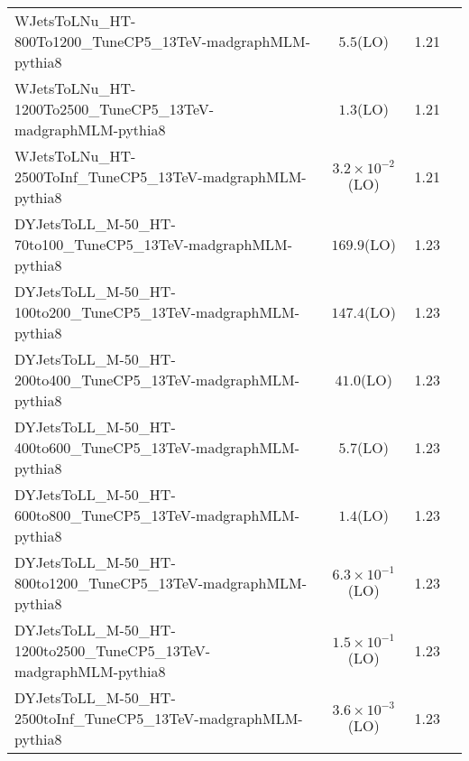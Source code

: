 \begin{tabular}{|l|cc|c|}
    WJetsToLNu\_HT-800To1200\_TuneCP5\_13TeV-madgraphMLM-pythia8                            &     $5.5$(LO)                   & 1.21  \\
    WJetsToLNu\_HT-1200To2500\_TuneCP5\_13TeV-madgraphMLM-pythia8                           &     $1.3$(LO)                   & 1.21  \\
    WJetsToLNu\_HT-2500ToInf\_TuneCP5\_13TeV-madgraphMLM-pythia8                            &     $3.2\times 10^{-2}$(LO)     & 1.21  \\
    DYJetsToLL\_M-50\_HT-70to100\_TuneCP5\_13TeV-madgraphMLM-pythia8             &     $169.9$(LO)                 & 1.23  \\
    DYJetsToLL\_M-50\_HT-100to200\_TuneCP5\_13TeV-madgraphMLM-pythia8            &     $147.4$(LO)                 & 1.23  \\
    DYJetsToLL\_M-50\_HT-200to400\_TuneCP5\_13TeV-madgraphMLM-pythia8            &     $41.0$(LO)                  & 1.23  \\
    DYJetsToLL\_M-50\_HT-400to600\_TuneCP5\_13TeV-madgraphMLM-pythia8            &     $5.7$(LO)                   & 1.23  \\
    DYJetsToLL\_M-50\_HT-600to800\_TuneCP5\_13TeV-madgraphMLM-pythia8            &     $1.4$(LO)                   & 1.23  \\
    DYJetsToLL\_M-50\_HT-800to1200\_TuneCP5\_13TeV-madgraphMLM-pythia8           &     $6.3\times 10^{-1}$(LO)     & 1.23  \\
    DYJetsToLL\_M-50\_HT-1200to2500\_TuneCP5\_13TeV-madgraphMLM-pythia8          &     $1.5\times 10^{-1}$(LO)     & 1.23  \\
    DYJetsToLL\_M-50\_HT-2500toInf\_TuneCP5\_13TeV-madgraphMLM-pythia8           &     $3.6\times 10^{-3}$(LO)     & 1.23  \\
    \hline
\end{tabular}
